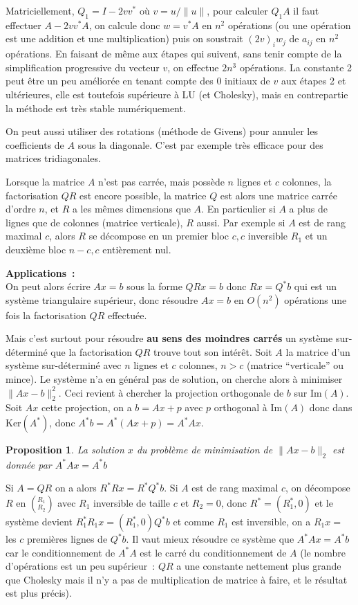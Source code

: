 \documentclass[a4paper,11pt]{article}
\newtheorem{prop}[thm]{Proposition}
\begin{document}
\begin{giacjshere}
Matriciellement, $Q_1=I-2vv^*$ o\`u $v=u/\|u\|$, pour calculer $Q_1A$
il faut effectuer $A-2vv^*A$, on calcule donc $w=v^*A$ en $n^2$
op\'erations (ou une op\'eration est une addition et une
multiplication) puis on soustrait $(2v)_i w_j$ de $a_{ij}$ en $n^2$
op\'erations. En faisant de m\^eme aux \'etapes qui suivent, sans
tenir compte de la simplification progressive du vecteur $v$, on 
effectue $2n^3$ op\'erations. La constante 2 peut \^etre 
un peu am\'elior\'ee en tenant compte des 0 initiaux de $v$ aux
\'etapes 2 et ult\'erieures, elle est toutefois sup\'erieure \`a LU
(et Cholesky), mais en contrepartie
la m\'ethode est tr\`es stable num\'eriquement.

On peut aussi utiliser des rotations (m\'ethode de Givens) pour
annuler les coefficients de $A$ sous la diagonale. C'est par exemple
tr\`es efficace pour des matrices tridiagonales.

Lorsque la matrice $A$ n'est pas carr\'ee, mais poss\`ede $n$ lignes
et $c$ colonnes, la factorisation $QR$ est encore possible, la matrice
$Q$ est alors une matrice carr\'ee d'ordre $n$, et $R$ a les m\^emes
dimensions que $A$. En particulier si $A$ a plus de lignes que de
colonnes (matrice verticale), $R$ aussi. Par exemple si $A$ est de 
rang maximal $c$, alors $R$ se d\'ecompose en un premier bloc
$c,c$ inversible $R_1$ et un deuxi\`eme bloc $n-c,c$ enti\`erement nul.

{\bf Applications~:}\\
On peut alors écrire $Ax=b$ sous la forme $QRx=b$
donc $Rx=Q^*b$ qui est un système triangulaire supérieur,
donc résoudre $Ax=b$ en $O(n^2)$ opérations une fois 
la factorisation $QR$ effectu\'ee.\\

Mais c'est surtout pour résoudre {\bf au sens des moindres carrés}
un système sur-déterminé que la factorisation $QR$ trouve tout
son intérêt. Soit $A$ la matrice d'un syst\`eme sur-d\'etermin\'e
avec $n$ lignes et $c$ colonnes, $n>c$ (matrice ``verticale'' ou mince).
Le syst\`eme n'a en g\'en\'eral pas de solution, on cherche alors
\`a minimiser $\| Ax-b \|_2^2$. Ceci revient \`a
chercher la projection orthogonale de $b$ sur Im$(A)$.
Soit $Ax$ cette projection, on a $b=Ax+p$ avec $p$ orthogonal
\`a Im$(A)$ donc dans Ker$(A^*)$, donc $A^*b=A^*(Ax+p)=A^*Ax$.
\begin{prop}
La solution $x$ du probl\`eme de minimisation de $\| Ax-b \|_2$
est donn\'ee par $A^*Ax=A^*b$
\end{prop}
Si $A=QR$ on a alors $R^* R x=R^* Q^*b$. Si $A$ est de rang maximal
$c$, on d\'ecompose $R$ en $(^{R_1}_{R_2})$ avec $R_1$ inversible de
taille $c$ et
$R_2=0$, donc $R^*=(R_1^*, 0)$ et le syst\`eme devient $R_1^*R_1x =(R_1^*,0) Q^*b $
et comme $R_1$ est inversible, on a $R_1x=$ les $c$ premi\`eres lignes
de $Q^*b$.
Il vaut mieux résoudre ce syst\`eme que $A^* Ax=A^*b$ car
le conditionnement de $A^* A$ est le carré du conditionnement
de $A$ (le nombre d'opérations est un peu sup\'erieur~:
$QR$ a une constante nettement plus grande que Cholesky mais
il n'y a pas de multiplication de matrice \`a faire, et le résultat
est plus précis).


\end{giacjshere}
\end{document}
